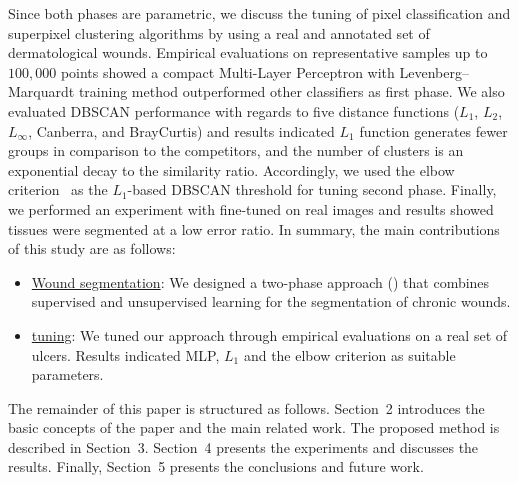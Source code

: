 Since both \system phases are parametric, we discuss the tuning of pixel classification and superpixel clustering algorithms by using a real and annotated set of dermatological wounds.
Empirical evaluations on representative samples up to $100{,}000$ points showed a compact Multi-Layer Perceptron with Levenberg--Marquardt training method outperformed other classifiers as \system first phase.
We also evaluated DBSCAN performance with regards to five distance functions ($L_1$, $L_2$, $L_\infty$, Canberra, and BrayCurtis) and results indicated $L_1$ function generates fewer groups in comparison to the competitors, and the number of clusters is an exponential decay to the similarity ratio.
Accordingly, we used the elbow criterion~\cite{Jolliffe2011} as the $L_1$-based DBSCAN threshold for tuning \system second phase.
Finally, we performed an experiment with fine-tuned \system on real images and results showed tissues were segmented at a low error ratio.
In summary, the main contributions of this study are as follows:

\begin{itemize}
\item \underline{Wound segmentation}: We designed a two-phase approach (\system) that combines supervised and unsupervised learning for the segmentation of chronic wounds.

\item \underline{\system tuning}: We tuned our approach through empirical evaluations on a real set of ulcers.
Results indicated MLP, $L_1$ and the elbow criterion as suitable \system parameters.
\end{itemize}

The remainder of this paper is structured as follows. 
Section~2 introduces the basic concepts of the paper and the main related work. 
The proposed method is described in Section~3. 
Section~4 presents the experiments and discusses the results. 
Finally, Section~5 presents the conclusions and future work.

